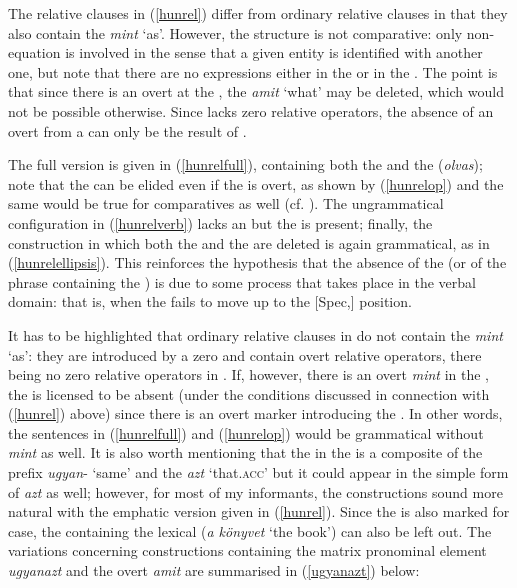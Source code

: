 The relative clauses in (\ref{hunrel}) differ from ordinary relative clauses in that they also contain the  \textit{mint} `as'. However, the structure is not comparative: only non- equation is involved in the sense that a given entity is identified with another one, but note that there are no  expressions either in the  or in the . The point is that since there is an overt  at the , the  \textit{amit} `what' may be deleted, which would not be possible otherwise. Since  lacks zero relative operators, the absence of an overt  from a  can only be the result of .

The full version is given in (\ref{hunrelfull}), containing both the  and the  (\textit{olvas}); note that the  can be elided even if the  is overt, as shown by (\ref{hunrelop}) and the same would be true for comparatives as well (cf. \citealt[59]{bacskaiatkarikantor2012}). The ungrammatical configuration in (\ref{hunrelverb}) lacks an  but the  is present; finally, the construction in which both the  and the  are deleted is again grammatical, as in (\ref{hunrelellipsis}). This reinforces the hypothesis that the absence of the  (or of the phrase containing the ) is due to some  process that takes place in the verbal domain: that is, when the  fails to move up to the [Spec,] position.

It has to be highlighted that ordinary relative clauses in  do not contain the  \textit{mint} `as': they are introduced by a zero  and contain overt relative operators, there being no zero relative operators in . If, however, there is an overt \textit{mint} in the , the  is licensed to be absent (under the conditions discussed in connection with (\ref{hunrel}) above) since there is an overt marker introducing the . In other words, the sentences in (\ref{hunrelfull}) and (\ref{hunrelop}) would be grammatical without \textit{mint} as well. It is also worth mentioning that the  in the  is a composite of the prefix \textit{ugyan}- `same' and the  \textit{azt} `that.\textsc{acc}' but it could appear in the simple form of \textit{azt} as well; however, for most of my informants, the constructions sound more natural with the emphatic version given in (\ref{hunrel}). Since the  is also marked for case, the  containing the lexical  (\textit{a könyvet} `the book') can also be left out. The variations concerning  constructions containing the matrix pronominal element \textit{ugyanazt} and the overt  \textit{amit} are summarised in (\ref{ugyanazt}) below:

